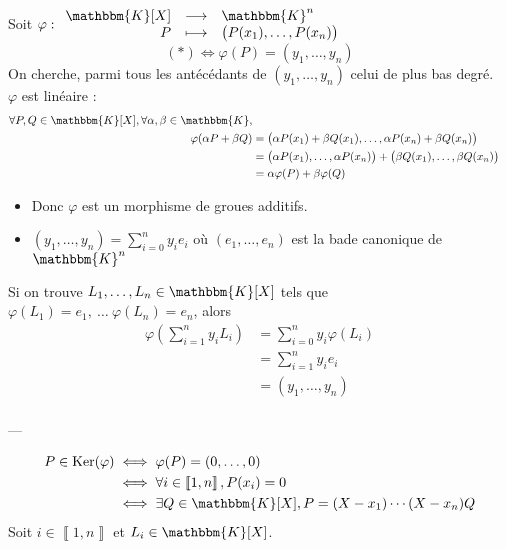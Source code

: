 \begin{exo}
	Soit $\varphi : \begin{array}{rcl}
		\mathbbm{K}[X] &\longrightarrow& \mathbbm{K}^n \\
		P &\longmapsto& \big(P(x_1), \ldots, P(x_n)\big)
	\end{array}$\\
	\[
		(*) \iff \varphi(P) = (y_1, \ldots, y_n)
	\] On cherche, parmi tous les antécédants de $(y_1, \ldots, y_n)$ celui de plus bas degré.\\
	$\varphi$ est linéaire :
	\begin{align*}
		\forall P,Q \in \mathbbm{K}[X], \forall \alpha, \beta \in \mathbbm{K},\\
		\varphi(\alpha P + \beta Q) &= \big(\alpha P(x_1) + \beta Q(x_1), \ldots, \alpha P(x_n) + \beta Q(x_n) \big) \\
		&= \big(\alpha P(x_1), \ldots, \alpha P(x_n)\big) + \big(\beta Q(x_1), \ldots, \beta Q(x_n)\big) \\
		&= \alpha \varphi(P) + \beta \varphi(Q) \\
	\end{align*}
	\begin{itemize}
		\item Donc $\varphi$ est un morphisme de groues additifs.
		\item $(y_1, \ldots, y_n) = \sum_{i = 0}^n y_i e_i$ où $(e_1, \ldots, e_n)$ est la bade canonique de $\mathbbm{K}^n$
	\end{itemize}
	Si on trouve $L_1, \ldots, L_n \in \mathbbm{K}[X]$ tels que $\varphi(L_1) = e_1, ~\ldots~ \varphi(L_n) = e_n$, alors
	\begin{align*}
		\varphi\left(\sum_{i=1}^n y_i L_i\right) &= \sum_{i=0}^n y_i \varphi(L_i)\\
		&= \sum_{i=1}^n y_i e_i\\
		&= (y_1, \ldots, y_n) \\
	\end{align*}
	\begin{center}
		---
	\end{center}
	\begin{align*}
		P \in \Ker(\varphi) &\iff \varphi(P) = (0,\ldots, 0)\\
												&\iff \forall i \in \left\llbracket 1,n \right\rrbracket, P(x_i) = 0\\
												&\iff \exists Q \in \mathbbm{K}[X], P = (X - x_1)\cdots(X-x_n) Q
	\end{align*}
	Soit $i \in \left\llbracket 1,n \right\rrbracket$ et $L_i \in \mathbbm{K}[X]$.\\

\end{exo}
